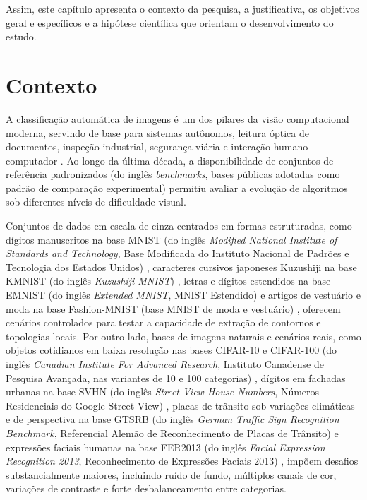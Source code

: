 \documentclass[
    12pt,
    openright,
    oneside,
    a4paper,
    english,
    brazil
]{abntex2}
\begin{document}
Assim, este capítulo apresenta o contexto da pesquisa, a justificativa, os objetivos geral e específicos e a hipótese científica que orientam o desenvolvimento do estudo.

\section{Contexto}

A classificação automática de imagens é um dos pilares da visão computacional moderna, servindo de base para sistemas autônomos, leitura óptica de documentos, inspeção industrial, segurança viária e interação humano-computador \cite{gonzalez2008digital,szeliski2022computer}. Ao longo da última década, a disponibilidade de conjuntos de referência padronizados (do inglês \textit{benchmarks}, bases públicas adotadas como padrão de comparação experimental) \cite{Wazlawick2020,lecun1998gradient} permitiu avaliar a evolução de algoritmos sob diferentes níveis de dificuldade visual.

Conjuntos de dados em escala de cinza centrados em formas estruturadas, como dígitos manuscritos na base MNIST (do inglês \textit{Modified National Institute of Standards and Technology}, Base Modificada do Instituto Nacional de Padrões e Tecnologia dos Estados Unidos) \cite{lecun1998gradient}, caracteres cursivos japoneses Kuzushiji na base KMNIST (do inglês \textit{Kuzushiji-MNIST}) \cite{clanuwat2018kmnist}, letras e dígitos estendidos na base EMNIST (do inglês \textit{Extended MNIST}, MNIST Estendido) \cite{cohen2017emnist} e artigos de vestuário e moda na base Fashion-MNIST (base MNIST de moda e vestuário) \cite{xiao2017fashionmnist}, oferecem cenários controlados para testar a capacidade de extração de contornos e topologias locais. Por outro lado, bases de imagens naturais e cenários reais, como objetos cotidianos em baixa resolução nas bases CIFAR-10 e CIFAR-100 (do inglês \textit{Canadian Institute For Advanced Research}, Instituto Canadense de Pesquisa Avançada, nas variantes de 10 e 100 categorias) \cite{krizhevsky2009learning}, dígitos em fachadas urbanas na base SVHN (do inglês \textit{Street View House Numbers}, Números Residenciais do Google Street View) \cite{netzer2011svhn}, placas de trânsito sob variações climáticas e de perspectiva na base GTSRB (do inglês \textit{German Traffic Sign Recognition Benchmark}, Referencial Alemão de Reconhecimento de Placas de Trânsito) \cite{stallkamp2012gtsrb} e expressões faciais humanas na base FER2013 (do inglês \textit{Facial Expression Recognition 2013}, Reconhecimento de Expressões Faciais 2013) \cite{goodfellow2013fer2013}, impõem desafios substancialmente maiores, incluindo ruído de fundo, múltiplos canais de cor, variações de contraste e forte desbalanceamento entre categorias.
\end{document}
